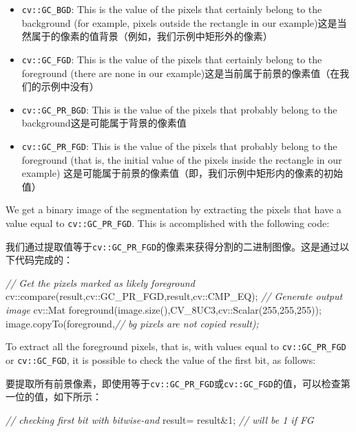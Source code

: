 \documentclass[]{article}
\newenvironment{Shaded}{}{}
\newcommand{\CommentTok}[1]{\textcolor[rgb]{0.38,0.63,0.69}{\textit{#1}}}
\newcommand{\DecValTok}[1]{\textcolor[rgb]{0.25,0.63,0.44}{#1}}
\newcommand{\NormalTok}[1]{#1}
\begin{document}
\begin{itemize}
\item
  \texttt{cv::GC\_BGD}: This is the value of the pixels that certainly
  belong to the background (for example, pixels outside the rectangle in
  our example)这是当然属于的像素的值背景（例如，我们示例中矩形外的像素）
\item
  \texttt{cv::GC\_FGD}: This is the value of the pixels that certainly
  belong to the foreground (there are none in our
  example)这是当前属于前景的像素值（在我们的示例中没有）
\item
  \texttt{cv::GC\_PR\_BGD}: This is the value of the pixels that
  probably belong to the background这是可能属于背景的像素值
\item
  \texttt{cv::GC\_PR\_FGD}: This is the value of the pixels that
  probably belong to the foreground (that is, the initial value of the
  pixels inside the rectangle in our example)
  这是可能属于前景的像素值（即，我们示例中矩形内的像素的初始值）
\end{itemize}

We get a binary image of the segmentation by extracting the pixels that
have a value equal to \texttt{cv::GC\_PR\_FGD}. This is accomplished
with the following code:

我们通过提取值等于\texttt{cv::GC\_PR\_FGD}的像素来获得分割的二进制图像。这是通过以下代码完成的：

\begin{Shaded}
\begin{Highlighting}[]
\CommentTok{// Get the pixels marked as likely foreground}
\NormalTok{cv::compare(result,cv::GC_PR_FGD,result,cv::CMP_EQ);}
\CommentTok{// Generate output image}
\NormalTok{cv::Mat foreground(image.size(),CV_8UC3,cv::Scalar(}\DecValTok{255}\NormalTok{,}\DecValTok{255}\NormalTok{,}\DecValTok{255}\NormalTok{));}
\NormalTok{image.copyTo(foreground,}\CommentTok{// bg pixels are not copied result);}
\end{Highlighting}
\end{Shaded}

To extract all the foreground pixels, that is, with values equal to
\texttt{cv::GC\_PR\_FGD} or \texttt{cv::GC\_FGD}, it is possible to
check the value of the first bit, as follows:

要提取所有前景像素，即使用等于\texttt{cv::GC\_PR\_FGD}或\texttt{cv::GC\_FGD}的值，可以检查第一位的值，如下所示：

\begin{Shaded}
\begin{Highlighting}[]
\CommentTok{// checking first bit with bitwise-and}
\NormalTok{result= result&}\DecValTok{1}\NormalTok{; }\CommentTok{// will be 1 if FG}
\end{Highlighting}
\end{Shaded}
\end{document}
